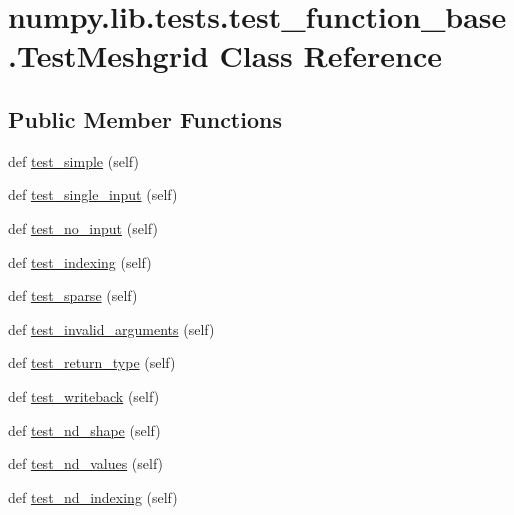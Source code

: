 \hypertarget{classnumpy_1_1lib_1_1tests_1_1test__function__base_1_1TestMeshgrid}{}\section{numpy.\+lib.\+tests.\+test\+\_\+function\+\_\+base.\+Test\+Meshgrid Class Reference}
\label{classnumpy_1_1lib_1_1tests_1_1test__function__base_1_1TestMeshgrid}
\subsection*{Public Member Functions}
\begin{DoxyCompactItemize}
\item 
def \hyperlink{classnumpy_1_1lib_1_1tests_1_1test__function__base_1_1TestMeshgrid_a9b9a5401370c1fa7d0ea4b924cfda53c}{test\+\_\+simple} (self)
\item 
def \hyperlink{classnumpy_1_1lib_1_1tests_1_1test__function__base_1_1TestMeshgrid_a6adaf6d7a754299d40913165f5178a76}{test\+\_\+single\+\_\+input} (self)
\item 
def \hyperlink{classnumpy_1_1lib_1_1tests_1_1test__function__base_1_1TestMeshgrid_a0035529d4807ade5f0c1a3801b7150d3}{test\+\_\+no\+\_\+input} (self)
\item 
def \hyperlink{classnumpy_1_1lib_1_1tests_1_1test__function__base_1_1TestMeshgrid_a3bab2e59256603cdd3778d8487eeec6e}{test\+\_\+indexing} (self)
\item 
def \hyperlink{classnumpy_1_1lib_1_1tests_1_1test__function__base_1_1TestMeshgrid_af68960e23f2be50f358efc4db23a45a2}{test\+\_\+sparse} (self)
\item 
def \hyperlink{classnumpy_1_1lib_1_1tests_1_1test__function__base_1_1TestMeshgrid_a61b344c9c3f50258e0d137eeff7bcce7}{test\+\_\+invalid\+\_\+arguments} (self)
\item 
def \hyperlink{classnumpy_1_1lib_1_1tests_1_1test__function__base_1_1TestMeshgrid_a99c16a225f7384241a74cea3cfc2f9de}{test\+\_\+return\+\_\+type} (self)
\item 
def \hyperlink{classnumpy_1_1lib_1_1tests_1_1test__function__base_1_1TestMeshgrid_ac70e92739e1f7536c01e18c79499b02e}{test\+\_\+writeback} (self)
\item 
def \hyperlink{classnumpy_1_1lib_1_1tests_1_1test__function__base_1_1TestMeshgrid_a571293414b495193c0a498820b9e07df}{test\+\_\+nd\+\_\+shape} (self)
\item 
def \hyperlink{classnumpy_1_1lib_1_1tests_1_1test__function__base_1_1TestMeshgrid_a2518b90a3bcd94c1e8eb8164c99634a6}{test\+\_\+nd\+\_\+values} (self)
\item 
def \hyperlink{classnumpy_1_1lib_1_1tests_1_1test__function__base_1_1TestMeshgrid_abe3cf6e196c58cf9fd4c4699f0453a28}{test\+\_\+nd\+\_\+indexing} (self)
\end{DoxyCompactItemize}



